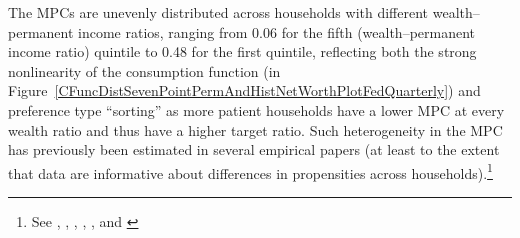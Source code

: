 \documentclass[12pt,titlepage]{econtex}
\begin{document}

% 
% 
% 
% 
% 


The MPCs are unevenly distributed across households with different wealth--permanent income ratios, ranging from 0.06 for the fifth (wealth--permanent income ratio) quintile to 0.48 for the first quintile, reflecting both the strong nonlinearity of the consumption function (in Figure~\ref{CFuncDistSevenPointPermAndHistNetWorthPlotFedQuarterly}) and preference type ``sorting'' as more patient households have a lower MPC at every wealth ratio and thus have a higher target ratio. Such heterogeneity in the MPC has previously been estimated in several empirical papers (at least to the extent that data are informative about differences in propensities across households).\footnote{%
  See  \citet{bppInequality}, \citet{brodaParker:stimulus2008}, \citet{leth-petersen:liquidity}, \citet{jappelliPistaferri_FPMPC}, \citet{jpsTax}, \citet{aslCredit} and  \citet{bps:familyLaborS}}
\end{document}
